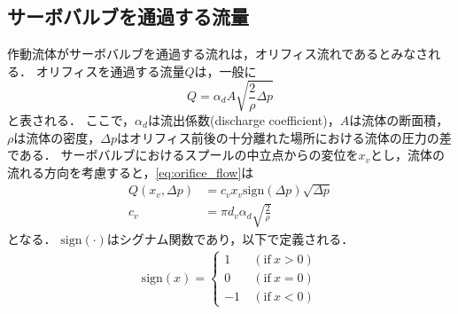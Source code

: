 \subsection{サーボバルブを通過する流量}
作動流体がサーボバルブを通過する流れは，オリフィス流れであるとみなされる．
オリフィスを通過する流量$Q$は，一般に
\begin{equation}
    Q = \alpha_d A \sqrt{\frac{2}{\rho}\Delta p}
    \label{eq:orifice_flow}
\end{equation}
と表される．
ここで，$\alpha_d$は流出係数(discharge coefficient)，$A$は流体の断面積，$\rho$は流体の密度，$\Delta p$はオリフィス前後の十分離れた場所における流体の圧力の差である．
サーボバルブにおけるスプールの中立点からの変位を$x_v$とし，流体の流れる方向を考慮すると，\eqnname\eqref{eq:orifice_flow}は
\begin{align}
    \label{eq:orifice_valve}
    Q(x_v,\Delta p)&= c_vx_v\mathrm{sign}(\Delta p)\sqrt{\Delta p}\\
    c_v &= \pi d_v \alpha_d\sqrt{\frac{2}{\rho}}
\end{align}
となる．
$\mathrm{sign}(\cdot)$はシグナム関数であり，以下で定義される．
\begin{align}
    \label{eq:function_sign}
    \mathrm{sign}(x) = 
    \begin{cases}
        1~&(\mathrm{if}~x>0)\\
        0~&(\mathrm{if}~x=0)\\
        -1~&(\mathrm{if}~x<0)
    \end{cases}
\end{align}

